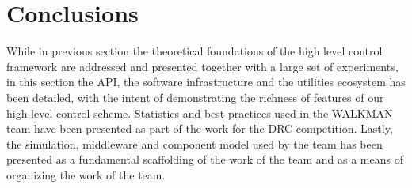 \section{Conclusions}
While in previous section the theoretical foundations of the high level control framework are addressed and presented together with a large set of experiments, in this section the API, the software infrastructure and the utilities ecosystem has been detailed, with the intent of demonstrating the richness of features of our high level control scheme.
Statistics and best-practices used in the WALKMAN team have been presented as part of the work for the DRC competition. Lastly, the simulation, middleware and component model used by the team has been presented as a fundamental scaffolding of the work of the team and as a means of organizing the work of the team.